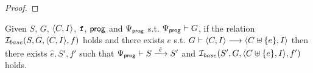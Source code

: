 \documentclass[12pt]{article}
\begin{document}
\begin{proof}
    

    
  
\end{proof}

\begin{lemma}
  Given $S$, $G$, $\langle C, I \rangle$, ${\mathtt{f}}$, $\mathsf{prog}$ and $\Psi_{\mathsf{prog}}$
  s.t. $\Psi_{\mathsf{prog}} \vdash G$,
  if the relation $\mathcal{I}_{base}(S, G, \langle C, I \rangle, f)$ holds and
  there exists $e$ s.t. $G \vdash \langle C, I \rangle \longrightarrow \langle C \uplus \{e\}, I \rangle$ then
  there exists $\hat{e}, S', f'$ such that
  $\Execs{\Prog} \vdash S \esstep{\hat{e}} S'$
  and $\mathcal{I}_{base}(S', G, \langle C \uplus \{e\}, I \rangle, f')$ holds.
\end{lemma}
\end{document}

